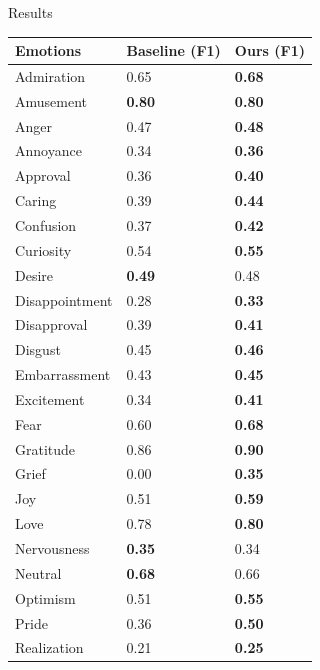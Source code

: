 \documentclass[final,20pt]{beamer}
\newlength{\onecolwid}
\begin{document}
\begin{frame}[t]
\begin{columns}[t]



\begin{column}{\onecolwid} %
\vspace*{-0.5in}

\begin{block}{Results}
\begin{table}[]
    \begin{center}
    \begin{tabular}{|p{10cm}|p{10cm}|p{10cm}|}
        \hline
        Emotions & Baseline (F1) & Ours (F1) \\
        \hline
        Admiration &  0.65 & \textbf{0.68} \\
        Amusement & \textbf{0.80} & \textbf{0.80}\\
        Anger & 0.47 & \textbf{0.48} \\
        Annoyance & 0.34 & \textbf{0.36} \\
        Approval & 0.36 & \textbf{0.40}\\
        Caring & 0.39 & \textbf{0.44} \\
        Confusion & 0.37 & \textbf{0.42} \\
        Curiosity & 0.54 & \textbf{0.55}\\
        Desire & \textbf{0.49} & 0.48\\
        Disappointment & 0.28 & \textbf{0.33} \\
        Disapproval & 0.39 & \textbf{0.41} \\
        Disgust & 0.45 & \textbf{0.46} \\
        Embarrassment & 0.43 & \textbf{0.45}\\
        Excitement & 0.34 & \textbf{0.41}\\
        Fear &  0.60 & \textbf{0.68} \\
        Gratitude & 0.86 & \textbf{0.90}\\
        Grief & 0.00 & \textbf{0.35}\\
        Joy & 0.51 & \textbf{0.59}\\
        Love & 0.78 & \textbf{0.80} \\
        Nervousness & \textbf{0.35} & 0.34 \\
        Neutral & \textbf{0.68} & 0.66\\
        Optimism & 0.51 & \textbf{0.55}\\
        Pride &  0.36 & \textbf{0.50}\\
        Realization & 0.21 & \textbf{0.25}\\

\end{tabular}
\end{center}
\end{table}
\end{block}
\end{column}
\end{columns}
\end{frame}
\end{document}
